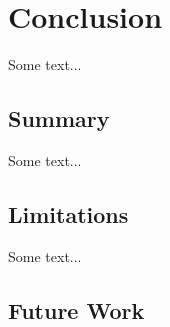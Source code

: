 \newpage
\section{Conclusion}

Some text...

\subsection{Summary}

Some text...

\subsection{Limitations}

Some text...

\subsection{Future Work}
